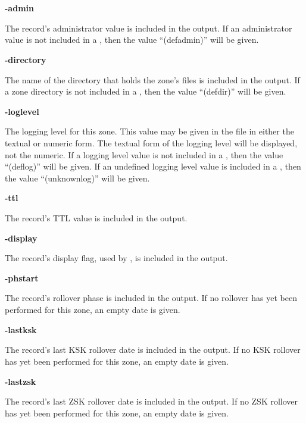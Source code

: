 \begin{description}
\item {\bf -admin}\verb" "

The record's administrator value is included in the output.  If an
administrator value is not included in a , then the value
``(defadmin)'' will be given.

\item {\bf -directory}\verb" "

The name of the directory that holds the zone's files is included in the
output.  If a zone directory is not included in a , then the
value ``(defdir)'' will be given.

\item {\bf -loglevel}\verb" "

The  logging level for this zone.  This value may be given in the
 file in either the textual or numeric form.  The textual form
of the logging level will be displayed, not the numeric.  If a logging level
value is not included in a , then the value ``(deflog)'' will
be given.  If an undefined logging level value is included in a
, then the value ``(unknownlog)'' will be given.

\item {\bf -ttl}\verb" "

The record's TTL value is included in the output.

\item {\bf -display}\verb" "

The record's display flag, used by , is included in the
output.

\item {\bf -phstart}\verb" "

The record's rollover phase is included in the output.
If no rollover has yet been performed for this zone, an empty date is given.

\item {\bf -lastksk}\verb" "

The record's last KSK rollover date is included in the output.
If no KSK rollover has yet been performed for this zone, an empty date is given.

\item {\bf -lastzsk}\verb" "

The record's last ZSK rollover date is included in the output.
If no ZSK rollover has yet been performed for this zone, an empty date is given.

\end{description}

